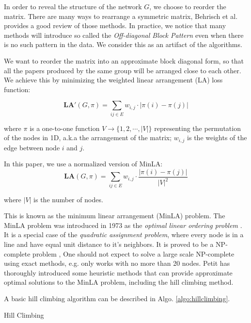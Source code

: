 In order to reveal the structure of the network $G$, we choose to reorder the matrix.
There are many ways to rearrange a symmetric matrix, Behrisch et al. \cite{behrisch_matrix_2016} provides a good review of those methods.
In practice, we notice that many methods will introduce so called the \emph{Off-diagonal Block Pattern} even when there is no such pattern in the data.
We consider this as an artifact of the algorithms.

We want to reorder the matrix into an approximate block diagonal form, so that all the papers produced by the same group will be arranged close to each other.
We achieve this by minimizing the weighted linear arrangement (LA) loss function:

\begin{equation}
    \textbf{LA}'(G, \pi) = \sum_{ij \in E} w_{i,j} \cdot |\pi(i) - \pi(j)|
\end{equation}

where $\pi$ is a one-to-one function $V \rightarrow \{1,2,\cdots,|V|\}$ representing the permutation of the nodes in 1D, a.k.a the arrangement of the matrix;
$w_{i,j}$ is the weights of the edge between node $i$ and $j$.

In this paper, we use a normalized version of MinLA:
\begin{equation}
    \textbf{LA}(G, \pi) = \sum_{ij \in E} w_{i,j} \cdot \frac{|\pi(i) - \pi(j)|}{|V|^2}
\end{equation}

where $|V|$ is the number of nodes.

This is known as the minimum linear arrangement (MinLA) problem.
The MinLA problem was introduced in 1973 as the \emph{optimal linear ordering problem} \cite{adolphson_optimal_1973}.
It is a special case of the \emph{quadratic assignment problem}, where every node is in a line and have equal unit distance to it's neighbors.
It is proved to be a NP-complete problem \cite{garey_simplified_1976},
One should not expect to solve a large scale NP-complete using exact methods, 
e.g. \cite{andrade_minimum_2017} only works with no more than 20 nodes.
Petit \cite{petit_experiments_2004} has thoroughly introduced some heuristic methods that can provide approximate optimal solutions to the MinLA problem, 
including the hill climbing method.

A basic hill climbing algorithm can be described in Algo. \ref{algo:hillclimbing}. 

\begin{algorithm}
    \caption{Hill Climbing}\label{algo:hillclimbing}
\end{algorithm}


